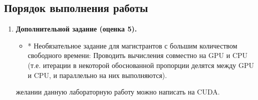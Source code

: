 { %
	\subsection{Порядок выполнения работы}
	\Large
	\begin{enumerate}
		 необходимо реализовать один (для оценки 3) или два (для оценки 4) этапа вашей программы из предыдущих лабораторных работ. При этом вычисления можно проводить как на CPU, так и на GPU (на своё усмотрение, но GPU предпочтительнее).
		\item\textbf{Дополнительной задание (оценка 5).}
			\begin{itemize}
				 заданий для оценки 3 и 4.
				 доверительного интервала. 
				 время 2 способами: с помощью profiling и с помощью обычного замера (как в предыдущих заданиях).
				 накладные расходы.
				\item* Необязательное задание для магистрантов с большим количеством свободного времени: Проводить вычисления совместно на GPU и CPU (т.е. итерации в некоторой обоснованной пропорции делятся между GPU и CPU, и параллельно на них выполняются).
			\end{itemize}
		 желании данную лабораторную работу можно написать на CUDA.
	\end{enumerate}
}